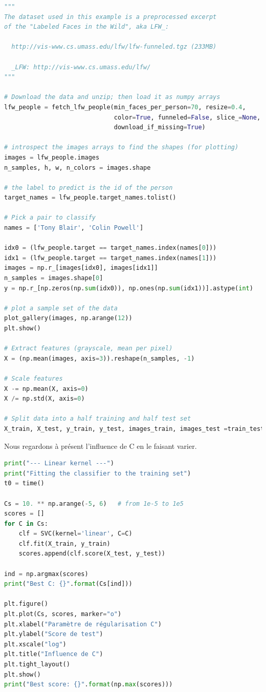 \documentclass{book}
\begin{document}
\begin{lstlisting}[language=Python, caption=Mise en place des données]
"""
The dataset used in this example is a preprocessed excerpt
of the "Labeled Faces in the Wild", aka LFW_:

  http://vis-www.cs.umass.edu/lfw/lfw-funneled.tgz (233MB)

  _LFW: http://vis-www.cs.umass.edu/lfw/
"""

# Download the data and unzip; then load it as numpy arrays
lfw_people = fetch_lfw_people(min_faces_per_person=70, resize=0.4,
                              color=True, funneled=False, slice_=None,
                              download_if_missing=True)

# introspect the images arrays to find the shapes (for plotting)
images = lfw_people.images
n_samples, h, w, n_colors = images.shape

# the label to predict is the id of the person
target_names = lfw_people.target_names.tolist()

# Pick a pair to classify
names = ['Tony Blair', 'Colin Powell']

idx0 = (lfw_people.target == target_names.index(names[0]))
idx1 = (lfw_people.target == target_names.index(names[1]))
images = np.r_[images[idx0], images[idx1]]
n_samples = images.shape[0]
y = np.r_[np.zeros(np.sum(idx0)), np.ones(np.sum(idx1))].astype(int)

# plot a sample set of the data
plot_gallery(images, np.arange(12))
plt.show()

# Extract features (grayscale, mean per pixel)
X = (np.mean(images, axis=3)).reshape(n_samples, -1)

# Scale features
X -= np.mean(X, axis=0)
X /= np.std(X, axis=0)

# Split data into a half training and half test set
X_train, X_test, y_train, y_test, images_train, images_test =train_test_split(X, y, images, test_size=0.5, random_state=0)
\end{lstlisting}

Nous regardons à présent l'influence de C en le faisant varier.

\begin{lstlisting}[language=Python, caption=Programme de visualisation de l'influence de C]
print("--- Linear kernel ---")
print("Fitting the classifier to the training set")
t0 = time()

Cs = 10. ** np.arange(-5, 6)   # from 1e-5 to 1e5
scores = []
for C in Cs:
    clf = SVC(kernel='linear', C=C)
    clf.fit(X_train, y_train)
    scores.append(clf.score(X_test, y_test))

ind = np.argmax(scores)
print("Best C: {}".format(Cs[ind]))

plt.figure()
plt.plot(Cs, scores, marker="o")
plt.xlabel("Paramètre de régularisation C")
plt.ylabel("Score de test")
plt.xscale("log")
plt.title("Influence de C")
plt.tight_layout()
plt.show()
print("Best score: {}".format(np.max(scores)))
\end{lstlisting}
\end{document}
